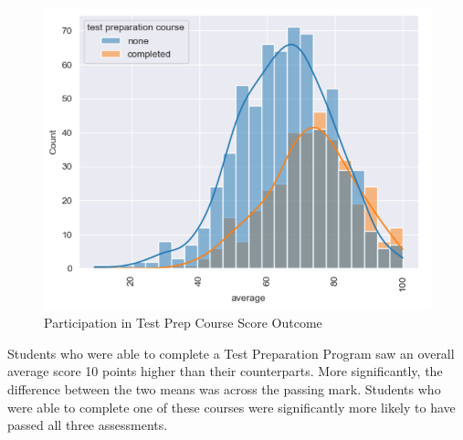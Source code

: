 \documentclass[doc]{apa6} %
\begin{document}
\begin{figure}[H]
    \centering
    \includegraphics[width=0.75\linewidth]{TestPrepOverall.png}
    \caption{Participation in Test Prep Course Score Outcome}
    \label{fig:TestPrepOverall}
\end{figure}
Students who were able to complete a Test Preparation Program saw an overall average score 10 points higher than their counterparts. More significantly, the difference between the two means was across the passing mark. Students who were able to complete one of these courses were significantly more likely to have passed all three assessments.
\end{document}
